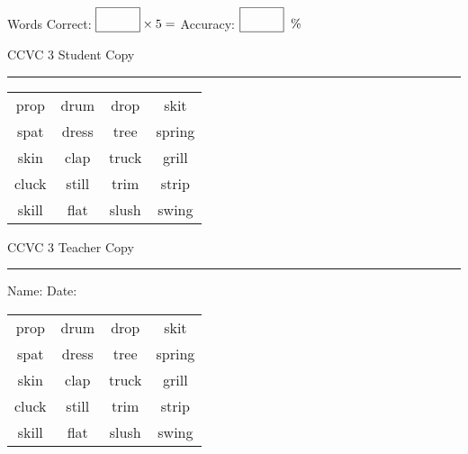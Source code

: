\documentclass{memoir}
\begin{document}
\normalsize

Words Correct: $\fbox{\phantom{\huge 100}} \times 5 = $ Accuracy: $\fbox{\phantom{\huge 100}}\;\; \%$ 

\vfill

\newpage


\footnotesize \noindent
CCVC 3 \hfill Student Copy
\smallskip
\hrule

\Large

\setlength{\tabcolsep}{14pt}
\def\arraystretch{3}

{\selectfont


\begin{vplace}[0.5]
\begin{center}
\begin{tabular}{cccc}
prop & drum & drop & skit \\
spat            & dress & tree & spring \\
skin & clap             & truck & grill            \\
cluck & still & trim & strip \\
skill & flat             & slush & swing \\
\end{tabular}
\end{center}
\end{vplace}

}

\newpage

\footnotesize \noindent
CCVC 3 \hfill Teacher Copy
\smallskip
\hrule

\normalsize

\vfill

\noindent
Name: \underline{\hspace{1.75in}} \hfill Date: \underline{\hspace{1in}}

\Large

{\selectfont


\begin{vplace}[0.5]
\begin{center}
\begin{tabular}{cccc}
prop & drum & drop & skit \\
spat            & dress & tree & spring \\
skin & clap             & truck & grill            \\
cluck & still & trim & strip \\
skill & flat             & slush & swing \\
\end{tabular}
\end{center}
\end{vplace}



}
\end{document}
